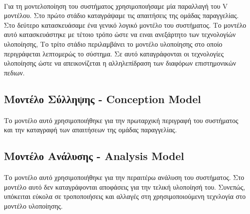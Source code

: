 \documentclass[a4paper,12pt,twoside]{report}
\begin{document}
			\paragraph{} {Για τη μοντελοποίηση του συστήματος χρησιμοποιήσαμε μία παραλλαγή του V μοντέλου. Στο πρώτο στάδιο καταγράψαμε τις απαιτήσεις της ομάδας παραγγελίας. Στο δεύτερο κατασκευάσαμε ένα γενικό λογικό μοντέλο του συστήματος. Το μοντέλο αυτό κατασκευάστηκε με τέτοιο τρόπο ώστε να ειναι ανεξάρτητο των τεχνολογίών υλοποίησης, Το τρίτο στάδιο περιλαμβάνει το μοντέλο υλοποίησης στο οποίο περιγράφεται λεπτομερώς το σύστημα. Σε αυτό καταγράφονται οι τεχνολογίες υλοποίησης ώστε να απεικονίζεται η αλληλεπίδραση των διαφόρων επιστημονικών πεδιων.
			}

			\subsection{Μοντέλο Σύλληψης - Conception Model}
			
				\paragraph{} {Το μοντέλο αυτό χρησιμοποιήθηκε για την πρωταρχική περιγραφή του συστήματος και την καταγραφή των απαιτήσεων της ομάδας παραγγελίας.
				}
			
			\subsection{Μοντέλο Ανάλυσης - Analysis Model}
			
				\paragraph{} {Το μοντέλο αυτό χρησιμοποιήθηκε για την περαιτέρω ανάλυση του συστήματος. Στο μοντέλο αυτό δεν καταγράφονται αποφάσεις για την τελική υλοποίησή του. Συνεπώς, υπόκειται εύκολα σε τροποποιήσεις και αλλαγές στη χρησιμοποιούμενη τεχνλογία στο μοντέλο υλοποίησης.
				}			
			
\end{document}
